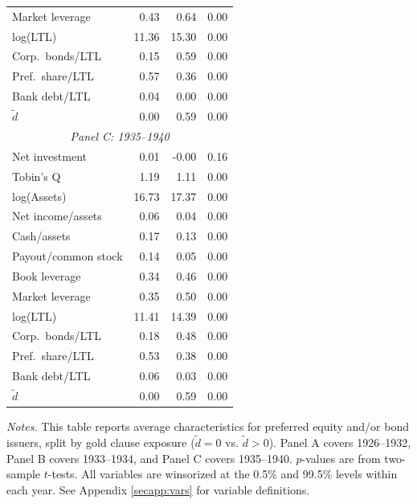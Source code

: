 \begin{table}[p]
\begin{threeparttable}
\begin{tabular}{lrrr}
            Market leverage & 0.43 & 0.64 & 0.00 \\
            log(LTL) & 11.36 & 15.30 & 0.00 \\
            Corp.\ bonds/LTL & 0.15 & 0.59 & 0.00 \\
            Pref.\ share/LTL & 0.57 & 0.36 & 0.00 \\
            Bank debt/LTL & 0.04 & 0.00 & 0.00 \\
            \ensuremath{\tilde{d}} & 0.00 & 0.59 & 0.00 \\
            \midrule
            \multicolumn{4}{c}{\textit{Panel C: 1935--1940}} \\
            \midrule
            Net investment & 0.01 & -0.00 & 0.16 \\
            Tobin's Q & 1.19 & 1.11 & 0.00 \\
            log(Assets) & 16.73 & 17.37 & 0.00 \\
            Net income/assets & 0.06 & 0.04 & 0.00 \\
            Cash/assets & 0.17 & 0.13 & 0.00 \\
            Payout/common stock & 0.14 & 0.05 & 0.00 \\
            Book leverage & 0.34 & 0.46 & 0.00 \\
            Market leverage & 0.35 & 0.50 & 0.00 \\
            log(LTL) & 11.41 & 14.39 & 0.00 \\
            Corp.\ bonds/LTL & 0.18 & 0.48 & 0.00 \\
            Pref.\ share/LTL & 0.53 & 0.38 & 0.00 \\
            Bank debt/LTL & 0.06 & 0.03 & 0.00 \\
            \ensuremath{\tilde{d}} & 0.00 & 0.59 & 0.00 \\
            \bottomrule
        \end{tabular}
    \end{threeparttable}
    
    \vspace*{3mm} \justifying \noindent
\scriptsize{\textit{Notes.} This table reports average characteristics for preferred equity and/or bond issuers, split by gold clause exposure ($\tilde{d} = 0$ vs. $\tilde{d} > 0$). Panel A covers 1926--1932, Panel B covers 1933--1934, and Panel C covers 1935--1940. $p$-values are from two-sample $t$-tests. All variables are winsorized at the 0.5\% and 99.5\% levels within each year. See Appendix \ref{secapp:vars} for variable definitions.}
\end{table}